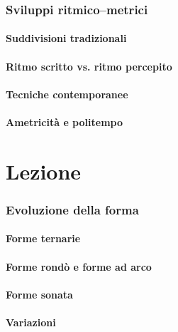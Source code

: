 \documentclass[\printmode,compress,xcolor=dvipsnames]{beamer}
\begin{document}
\section[Ritmo]{Sviluppi ritmico--metrici}
\subsection[Tradizione]{Suddivisioni tradizionali}
\subsection[Percezione]{Ritmo scritto vs. ritmo percepito}
\subsection[Tecniche]{Tecniche contemporanee}
\subsection[Politempo]{Ametricit\`a e politempo}

\part{Lezione }
\section[Forma]{Evoluzione della forma}
\subsection[Ternarie]{Forme ternarie}
\subsection[Arco]{Forme rond\`o e forme ad arco}
\subsection[Sonata]{Forme sonata}
\subsection{Variazioni}
\end{document}
